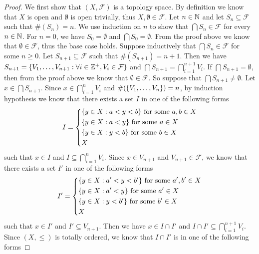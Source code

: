 \begin{proof}
  We first show that \((X, \mathcal{F})\) is a topology space.
  By definition we know that \(X\) is open and \(\emptyset\) is open trivially, thus \(X, \emptyset \in \mathcal{F}\).
  Let \(n \in \mathbb{N}\) and let \(S_n \subseteq \mathcal{F}\) such that \(\#(S_n) = n\).
  We use induction on \(n\) to show that \(\bigcap S_n \in \mathcal{F}\) for every \(n \in \mathbb{N}\).
  For \(n = 0\), we have \(S_0 = \emptyset\) and \(\bigcap S_0 = \emptyset\).
  From the proof above we know that \(\emptyset \in \mathcal{F}\), thus the base case holds.
  Suppose inductively that \(\bigcap S_n \in \mathcal{F}\) for some \(n \geq 0\).
  Let \(S_{n + 1} \subseteq \mathcal{F}\) such that \(\#(S_{n + 1}) = n + 1\).
  Then we have \(S_{n + 1} = \left\lbrace V_1, \dots, V_{n + 1} : \forall i \in \mathbb{Z}^+, V_i \in \mathcal{F}\right\rbrace\) and \(\bigcap S_{n + 1} = \bigcap_{i = 1}^{n + 1} V_i\).
  If \(\bigcap S_{n + 1} = \emptyset\), then from the proof above we know that \(\emptyset \in \mathcal{F}\).
  So suppose that \(\bigcap S_{n + 1} \neq \emptyset\).
  Let \(x \in \bigcap S_{n + 1}\).
  Since \(x \in \bigcap_{i = 1}^n V_i\) and \(\#(\left\lbrace V_1, \dots, V_n\right\rbrace) = n\), by induction hypothesis we know that there exists a set \(I\) in one of the following forms
  \[
    I = \begin{dcases}
      \set{y \in X : a < y < b} \text{ for some } a, b \in X \\
      \set{y \in X : a < y} \text{ for some } a \in X        \\
      \set{y \in X : y < b} \text{ for some } b \in X        \\
      X
    \end{dcases}
  \]
  such that \(x \in I\) and \(I \subseteq \bigcap_{i = 1}^n V_i\).
  Since \(x \in V_{n + 1}\) and \(V_{n + 1} \in \mathcal{F}\), we know that there exists a set \(I'\) in one of the following forms
  \[
    I' = \begin{dcases}
      \set{y \in X : a' < y < b'} \text{ for some } a', b' \in X \\
      \set{y \in X : a' < y} \text{ for some } a' \in X          \\
      \set{y \in X : y < b'} \text{ for some } b' \in X          \\
      X
    \end{dcases}
  \]
  such that \(x \in I'\) and \(I' \subseteq V_{n + 1}\).
  Then we have \(x \in I \cap I'\) and \(I \cap I' \subseteq \bigcap_{i = 1}^{n + 1} V_i\).
  Since \((X, \leq)\) is totally ordered, we know that \(I \cap I'\) is in one of the following forms

\end{proof}
